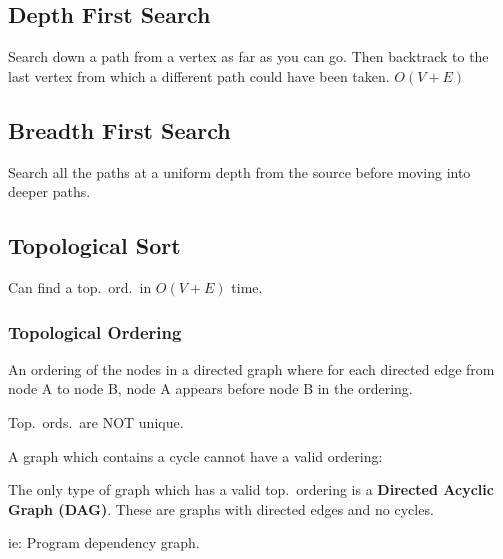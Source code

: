 \subsection*{Depth First Search}
Search down a path from a vertex as far as you can go. Then backtrack to the last vertex from which a different path could have been taken. $O(V+E)$

\subsection*{Breadth First Search}
Search all the paths at a uniform depth from the source before moving into deeper paths.

\subsection*{Topological Sort}
Can find a top.\ ord.\ in $O(V+E)$ time.

\subsubsection*{Topological Ordering}
An ordering of the nodes in a directed graph where for each directed edge from node A to node B,
node A appears before node B in the ordering.

Top.\ ords.\ are NOT unique.


A graph which contains a cycle cannot have a valid ordering:


The only type of graph which has a valid top.\ ordering is a {\bfseries Directed Acyclic Graph (DAG)}.
These are graphs with directed edges and no cycles.

ie: Program dependency graph.


